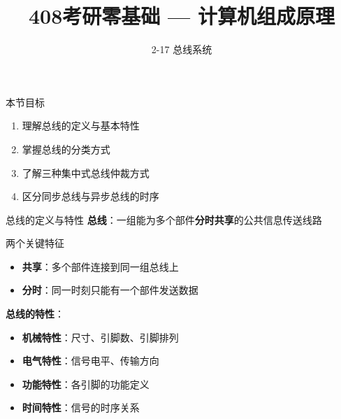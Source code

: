\documentclass[10pt, aspectratio=169]{beamer}
\title{408考研零基础 --- 计算机组成原理}
\subtitle{2-17 总线系统}
\author{}
\date{}
\begin{document}
\begin{frame}{本节目标}
    \begin{enumerate}
        \item 理解总线的定义与基本特性
        \item 掌握总线的分类方式
        \item 了解三种集中式总线仲裁方式
        \item 区分同步总线与异步总线的时序
    \end{enumerate}
\end{frame}

\begin{frame}{总线的定义与特性}
    \textbf{总线}：一组能为多个部件\textbf{分时共享}的公共信息传送线路
    \vspace{0.3em}
    \begin{block}{两个关键特征}
        \begin{itemize}
            \item \textbf{共享}：多个部件连接到同一组总线上
            \item \textbf{分时}：同一时刻只能有一个部件发送数据
        \end{itemize}
    \end{block}
    \vspace{0.3em}
    \textbf{总线的特性}：
    \begin{itemize}
        \item \textbf{机械特性}：尺寸、引脚数、引脚排列
        \item \textbf{电气特性}：信号电平、传输方向
        \item \textbf{功能特性}：各引脚的功能定义
        \item \textbf{时间特性}：信号的时序关系
    \end{itemize}
\end{frame}
\end{document}
